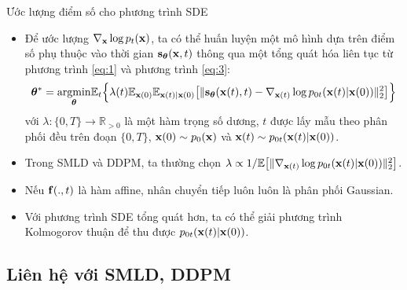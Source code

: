 \documentclass[10pt]{beamer}
\theoremstyle{remark}
\numberwithin{algocf}{section}
\numberwithin{equation}{section}
\numberwithin{dl}{section}
\numberwithin{figure}{section}
\begin{document}
\begin{frame}[shrink]{Ước lượng điểm số cho phương trình SDE}
	\begin{itemize}
		\item Để ước lượng $\nabla_{\bold{x}} \log p_t(\bold{x})$, ta có thể huấn luyện một mô hình dựa trên điểm số phụ thuộc vào thời gian $\bold{s}_{\boldsymbol{\theta}}(\bold{x}, t)$ thông qua một tổng quát hóa liên tục từ phương trình \ref{eq:1} và phương trình \ref{eq:3}:
		\begin{equation} \label{eq:7}
			\boldsymbol{\theta}^{\ast} = \underset{\boldsymbol{\theta}}{\mathrm{argmin}} \mathbb{E}_t \Big \lbrace  \lambda(t) \mathbb{E}_{\bold{x}(0)} \mathbb{E}_{\bold{x}(t) \vert \bold{x}(0)} \big \lbrack \lVert \bold{s}_{\boldsymbol{\theta}} (\bold{x}(t), t) - \nabla_{\bold{x}(t)} \log p_{0t} (\bold{x}(t) \vert \bold{x}(0)) \rVert_2^2 \big \rbrack \Big \rbrace
		\end{equation}
		với $\lambda: \lbrace 0, T \rbrace \rightarrow \mathbb{R}_{>0}$ là một hàm trọng số dương,
		$t$ được lấy mẫu theo phân phối đều trên đoạn $\lbrace 0, T \rbrace$, $\bold{x}(0) \sim p_0 (\bold{x})$ và $\bold{x}(t) \sim p_{0t} (\bold{x}(t) \vert \bold{x}(0))$.
		\item Trong SMLD và DDPM, ta thường chọn $\lambda \propto 1 / \mathbb{E} \big \lbrack \lVert \nabla_{\bold{x}(t)} \log p_{0t} (\bold{x}(t) \vert \bold{x}(0)) \rVert_2^2 \big \rbrack$.
		\item Nếu $\bold{f}(.,t)$ là hàm affine, nhân chuyển tiếp luôn luôn là phân phối Gaussian.
		\item Với phương trình SDE tổng quát hơn, ta có thể giải phương trình Kolmogorov thuận \citep{oksendal2003stochastic} để thu được $p_{0t} (\bold{x}(t) \vert \bold{x}(0))$.
	\end{itemize}
\end{frame}

\subsection{Liên hệ với SMLD, DDPM}
\end{document}

